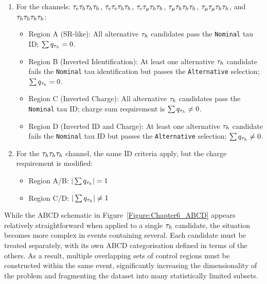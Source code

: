 \begin{enumerate}[label=(\roman*)]
    \item For the channels: $\tau_e\tau_h\tau_h\tau_h$, $\tau_e\tau_e\tau_h\tau_h$, $\tau_e\tau_\mu\tau_h\tau_h$, $\tau_\mu\tau_h\tau_h\tau_h$, $\tau_\mu\tau_\mu\tau_h\tau_h$, and $\tau_h\tau_h\tau_h\tau_h$:
    \begin{itemize}
        \item Region A (SR-like): All alternative $\tau_h$ candidates pass the \texttt{Nominal} tau ID; $\sum q_{\tau_h} = 0$.

        \item Region B (Inverted Identification): At least one alternative $\tau_h$ candidate fails the \texttt{Nominal} tau identification but passes the \texttt{Alternative} selection; $\sum q_{\tau_h} = 0$.

        \item Region C (Inverted Charge): All alternative $\tau_h$ candidates pass the \texttt{Nominal} tau ID; charge sum requirement is $\sum q_{\tau_h} \neq 0$.

        \item Region D (Inverted ID and Charge): At least one alternative $\tau_h$ candidate fails the \texttt{Nominal} tau ID but passes the \texttt{Alternative} selection; $\sum q_{\tau_h} \neq 0$.
    \end{itemize}

    \item For the $\tau_h\tau_h\tau_h$ channel, the same ID criteria apply, but the charge requirement is modified:
    \begin{itemize}
        \item Region A/B: $|\sum q_{\tau_h}| = 1$
        \item Region C/D: $|\sum q_{\tau_h}| \neq 1$
    \end{itemize}
\end{enumerate}

While the ABCD schematic in Figure~\ref{Figure:Chapter6_ABCD} appears relatively straightforward when applied to a single $\tau_h$ candidate, the situation becomes more complex in events containing several. Each candidate must be treated separately, with its own ABCD categorisation defined in terms of the others. As a result, multiple overlapping sets of control regions must be constructed within the same event, significantly increasing the dimensionality of the problem and fragmenting the dataset into many statistically limited subsets.

